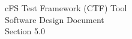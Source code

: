 \documentclass[twoside]{article}
\begin{document}
\hypersetup{pageanchor=false}
\begin{titlepage}
\begin{center}%
\vspace*{7.5cm}
{\Huge cFS Test Framework (CTF) Tool}\\
\vspace*{0.5cm}
{\Huge Software Design Document}\\
\vspace*{0.5cm}
{\Huge Section 5.0}\\
\end{center}
\end{titlepage}
\tableofcontents
{}
\hypersetup{pageanchor=true}

\end{document}
